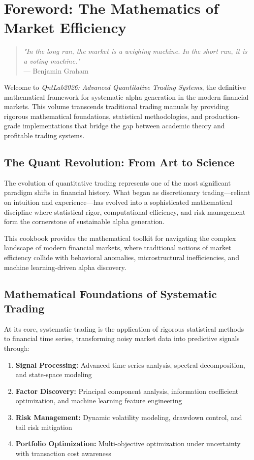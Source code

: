 \documentclass[11pt,letterpaper,openany]{book}
\begin{document}
\chapter*{Foreword: The Mathematics of Market Efficiency}

\begin{quote}
\textit{"In the long run, the market is a weighing machine. In the short run, it is a voting machine."} \\
--- Benjamin Graham
\end{quote}

Welcome to \textit{QntLab2026: Advanced Quantitative Trading Systems}, the definitive mathematical framework for systematic alpha generation in the modern financial markets. This volume transcends traditional trading manuals by providing rigorous mathematical foundations, statistical methodologies, and production-grade implementations that bridge the gap between academic theory and profitable trading systems.

\section*{The Quant Revolution: From Art to Science}

The evolution of quantitative trading represents one of the most significant paradigm shifts in financial history. What began as discretionary trading—reliant on intuition and experience—has evolved into a sophisticated mathematical discipline where statistical rigor, computational efficiency, and risk management form the cornerstone of sustainable alpha generation.

This cookbook provides the mathematical toolkit for navigating the complex landscape of modern financial markets, where traditional notions of market efficiency collide with behavioral anomalies, microstructural inefficiencies, and machine learning-driven alpha discovery.

\section*{Mathematical Foundations of Systematic Trading}

At its core, systematic trading is the application of rigorous statistical methods to financial time series, transforming noisy market data into predictive signals through:

\begin{enumerate}
    \item \textbf{Signal Processing:} Advanced time series analysis, spectral decomposition, and state-space modeling
    \item \textbf{Factor Discovery:} Principal component analysis, information coefficient optimization, and machine learning feature engineering
    \item \textbf{Risk Management:} Dynamic volatility modeling, drawdown control, and tail risk mitigation
    \item \textbf{Portfolio Optimization:} Multi-objective optimization under uncertainty with transaction cost awareness
\end{enumerate}
\end{document}
